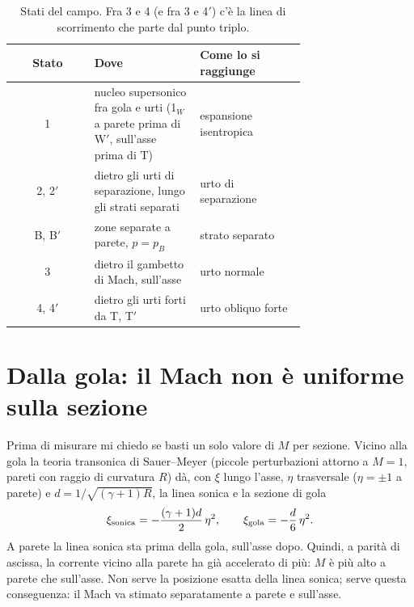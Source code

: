 
\begin{table}[H]
\centering\small
\begin{tabular}{cp{0.36\linewidth}p{0.36\linewidth}}
\toprule
Stato & Dove & Come lo si raggiunge \\
\midrule
1 & nucleo supersonico fra gola e urti (1$_W$ a parete prima di W$'$, sull'asse prima di T) & espansione isentropica \\
2, 2$'$ & dietro gli urti di separazione, lungo gli strati separati & urto di separazione \\
B, B$'$ & zone separate a parete, $p=p_B$ & strato separato \\
3 & dietro il gambetto di Mach, sull'asse & urto normale \\
4, 4$'$ & dietro gli urti forti da T, T$'$ & urto obliquo forte \\
\bottomrule
\end{tabular}
\caption{Stati del campo. Fra 3 e 4 (e fra 3 e 4$'$) c'è la linea di scorrimento che parte dal punto triplo.}
\end{table}

\section*{Dalla gola: il Mach non è uniforme sulla sezione}
Prima di misurare mi chiedo se basti un solo valore di $M$ per sezione. Vicino alla gola la teoria transonica di
Sauer--Meyer (piccole perturbazioni attorno a $M=1$, pareti con raggio di curvatura $R$) dà, con $\xi$ lungo l'asse,
$\eta$ trasversale ($\eta=\pm1$ a parete) e $d=1/\sqrt{(\gamma+1)R}$, la linea sonica e la sezione di gola
\begin{gather*}
\xi_{\rm sonica}=-\frac{(\gamma+1)d}{2}\,\eta^2 ,\qquad \xi_{\rm gola}=-\frac d6\,\eta^2 .
\end{gather*}
A parete la linea sonica sta prima della gola, sull'asse dopo. Quindi, a parità di ascissa, la corrente vicino alla
parete ha già accelerato di più: $M$ è più alto a parete che sull'asse. Non serve la posizione esatta della linea
sonica; serve questa conseguenza: il Mach va stimato separatamente a parete e sull'asse.

